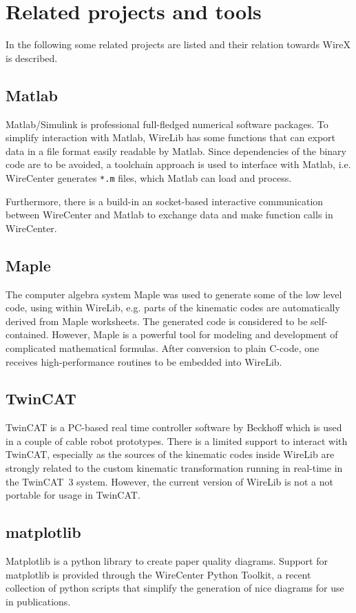 \documentclass[11pt,a4paper,onepage,openany]{book}
\begin{document}
\section{Related projects and tools}
In the following some related projects are listed and their relation towards
WireX is described.

\subsection{Matlab}
Matlab/Simulink is professional full-fledged numerical software packages. To
simplify interaction with Matlab, WireLib has some functions that can export
data in a file format easily readable by Matlab. Since dependencies of the
binary code are to be avoided, a toolchain approach is used to interface with
Matlab, i.e. WireCenter generates \texttt{*.m} files, which Matlab can load and
process.

Furthermore, there is a build-in an socket-based interactive communication
between WireCenter and Matlab to exchange data and make function calls in
WireCenter.

\subsection{Maple}
The computer algebra system Maple was used to generate some of the low level
code, using within WireLib, e.g. parts of the kinematic codes are
automatically
derived from Maple worksheets. The generated code is considered to be
self-contained. However, Maple is a powerful tool for modeling and
development
of complicated mathematical formulas. After conversion to plain C-code, one
receives high-performance routines to be embedded into WireLib.

\subsection{TwinCAT}
TwinCAT is a PC-based real time controller software by Beckhoff which is used
 in a couple of cable robot prototypes. There is a limited support to interact
 with TwinCAT, especially as the sources of the kinematic codes inside WireLib
 are strongly related to the custom kinematic transformation running in
 real-time in the TwinCAT~3 system. However, the current version of WireLib is
 not a not portable for usage in TwinCAT.

\subsection{matplotlib}
Matplotlib is a python library to create paper quality diagrams. Support for
matplotlib is provided through the WireCenter Python Toolkit, a recent
collection of python scripts that simplify the generation of nice diagrams
for use in publications.
\end{document}
